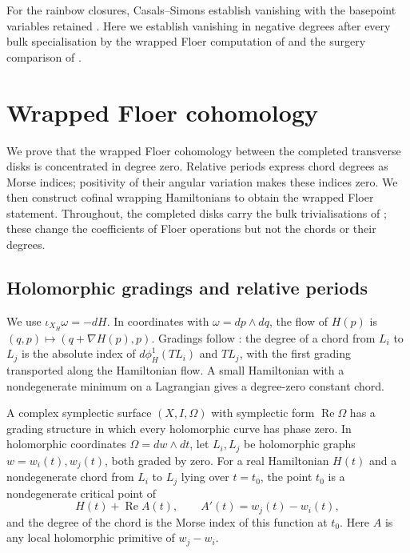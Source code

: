 \documentclass[a4paper]{amsart}
\DeclareMathOperator{\Ree}{Re}
\numberwithin{equation}{section}
\begin{document}
\begin{remark}\label{rem:rainbow-specialisation}
For the rainbow closures, Casals--Simons establish vanishing with the
basepoint variables retained \cite[Main Theorem]{CSrainbow}. Here we
establish vanishing in negative degrees after every bulk specialisation
by the wrapped Floer computation of  and the
surgery comparison of .
\end{remark}

\section{Wrapped Floer cohomology}
\label{sec:foundations}

We prove that the wrapped Floer cohomology between the completed
transverse disks is concentrated in degree zero. Relative periods
express chord degrees as Morse indices; positivity of their angular
variation makes these indices zero. We then construct cofinal wrapping
Hamiltonians to obtain the wrapped Floer statement. Throughout, the completed
disks carry the bulk trivialisations of ; these
change the coefficients of Floer operations but not the chords or their degrees.

\subsection{Holomorphic gradings and relative periods}
\label{subsec:holomorphic-gradings}

We use $\iota_{X_H}\omega=-dH$. In coordinates with
$\omega=dp\wedge dq$, the flow of $H(p)$ is
$(q,p)\mapsto(q+\nabla H(p),p)$. Gradings follow
\cite[Section~2d]{SeidelGraded}: the degree of a chord from $L_i$ to
$L_j$ is the absolute index of $d\phi_H^1(TL_i)$ and $TL_j$, with
the first grading transported along the Hamiltonian flow. A small
Hamiltonian with a nondegenerate minimum on a Lagrangian gives a
degree-zero constant chord.

\begin{lemma}\label{lem:phase}
A complex symplectic surface $(X,I,\Omega)$ with symplectic form
$\Ree\Omega$ has a grading structure in which every holomorphic curve
has phase zero. In holomorphic coordinates $\Omega=dw\wedge dt$,
let $L_i,L_j$ be holomorphic graphs $w=w_i(t),w_j(t)$, both graded
by zero. For a real Hamiltonian $H(t)$ and a nondegenerate chord
from $L_i$ to $L_j$ lying over $t=t_0$, the point $t_0$ is a
nondegenerate critical point of
\[
 H(t)+\Ree A(t),\qquad A'(t)=w_j(t)-w_i(t),
\]
and the degree of the chord is the Morse index of this function at $t_0$.
Here $A$ is any local holomorphic primitive of $w_j-w_i$.
\end{lemma}
\end{document}
